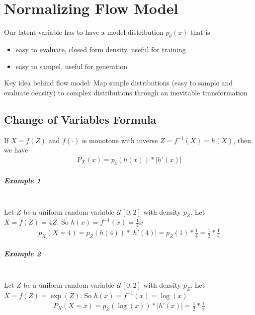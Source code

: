 \chapter{Normalizing Flow Model}
Our latent variable has to have a model distribution $p_\theta(x)$ that is 
    \begin{itemize}
        \item easy to evaluate, closed form density, useful for training 
        \item easy to sampel, useful for generation
    \end{itemize}
Key idea behind flow model: Map simple distributions (easy to sample and evaluate density) to complex distributions through an inevitable transformation 

\section{Change of Variables Formula} 
If $X = f(Z)$ and $f(\cdot)$ is monotone with inverse $Z = f^{-1}(X) = h(X)$, then we have 
    \begin{align*}
        P_X(x) = p_z(h(x)) * | h'(x)| 
    \end{align*}
    
\paragraph{Example 1} \mbox{}\\
Let $Z$ be a uniform random variable $\mathcal{U}[0,2]$ with density $p_Z$. Let $X = f(Z) = 4Z$. So $h(x) = f^{-1}(x) = \frac{1}{4}x$
    \begin{align*}
        p_X(X=4) = p_Z(h(4)) * |h'(4)| = p_Z(1) * \frac{1}{4} = \frac{1}{2} * \frac{1}{4}
    \end{align*}
    
    
\paragraph{Example 2} \mbox{}\\
Let $Z$ be a uniform random variable $\mathcal{U}[0,2]$ with density $p_Z$. Let $X = f(Z) = \exp(Z)$. So $h(x) = f^{-1}(x) = \log (x)$
    \begin{align*}
        P_X(X=x) = p_Z(\log(x)) * |h'(x)| = \frac{1}{2} * \frac{1}{x}
    \end{align*}
    
